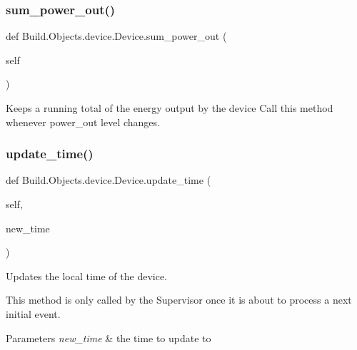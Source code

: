 \subsubsection{\texorpdfstring{sum\+\_\+power\+\_\+out()}{sum\_power\_out()}}
{\footnotesize\ttfamily def Build.\+Objects.\+device.\+Device.\+sum\+\_\+power\+\_\+out (\begin{DoxyParamCaption}\item[{}]{self }\end{DoxyParamCaption})}



Keeps a running total of the energy output by the device Call this method whenever power\+\_\+out level changes. 

\mbox{\label{class_build_1_1_objects_1_1device_1_1_device_a12de2674ec41c3cfb31689fde187f6e0}} 
\subsubsection{\texorpdfstring{update\+\_\+time()}{update\_time()}}
{\footnotesize\ttfamily def Build.\+Objects.\+device.\+Device.\+update\+\_\+time (\begin{DoxyParamCaption}\item[{}]{self,  }\item[{}]{new\+\_\+time }\end{DoxyParamCaption})}



Updates the local time of the device. 

This method is only called by the Supervisor once it is about to process a next initial event. 
\begin{DoxyParams}{Parameters}
{\em new\+\_\+time} & the time to update to \\
\hline
\end{DoxyParams}
\mbox{\label{class_build_1_1_objects_1_1device_1_1_device_aff92b20a263ce0f7a715789305ca0d30}} 
